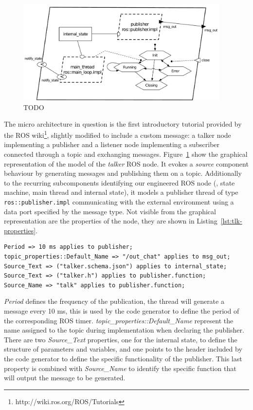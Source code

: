 \begin{figure}[t]
\centering
\includegraphics[width=0.95\textwidth]{gfx/usecase-publisher}
\caption{TODO}\label{fig:usecase-publisher}
\end{figure}

The micro architecture in question is the first introductory tutorial provided by the ROS wiki\footnote{http://wiki.ros.org/ROS/Tutorials}, slightly modified to include a custom message: a talker node implementing a publisher and a listener node implementing a subscriber connected through a topic and exchanging messages. Figure~\ref{fig:usecase-publisher} show the graphical representation of the model of the \textit{talker} ROS node. It evokes a \textit{source} component behaviour by generating messages and publishing them on a topic. Additionally to the recurring subcomponents identifying our engineered ROS node (\ie, state machine, main thread and internal state), it models a publisher thread of type \texttt{ros::publisher.impl} communicating with the external environment using a data port specified by the message type. Not visible from the graphical representation are the properties of the node, they are shown in Listing~\ref{lst:tlk-properties}.

\begin{lstlisting}[language=AADL,caption={TODO},label=lst:tlk-properties]
Period => 10 ms applies to publisher;
topic_properties::Default_Name => "/out_chat" applies to msg_out;
Source_Text => ("talker.schema.json") applies to internal_state;
Source_Text => ("talker.h") applies to publisher.function;
Source_Name => "talk" applies to publisher.function;
\end{lstlisting}

\textit{Period} defines the frequency of the publication, the thread will generate a message every 10 ms, this is used by the code generator to define the period of the corresponding ROS timer. \textit{topic\_properties::Default\_Name} represent the name assigned to the topic during implementation when declaring the publisher. There are two \textit{Source\_Text} properties, one for the internal state, to define the structure of parameters and variables, and one points to the header included by the code generator to define the specific functionality of the publisher. This last property is combined with \textit{Source\_Name} to identify the specific function that will output the message to be generated.


